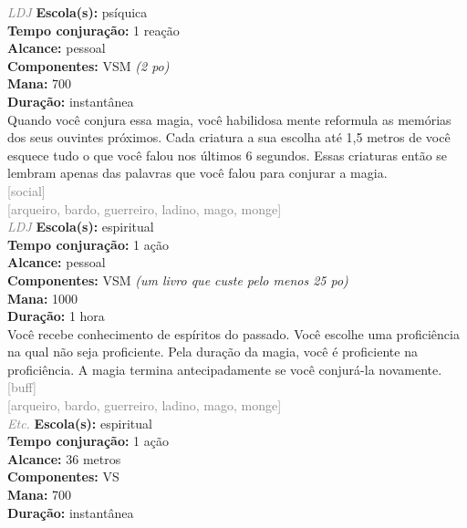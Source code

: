 \documentclass{RPG_Adventure}[2021/10/20]
\begin{document}
{\tiny \textcolor{gray}{\textit{LDJ}}}\jump{}
{\small \t \textbf{Escola(s):} psíquica\\\t \textbf{Tempo conjuração:} 1 reação\\\t \textbf{Alcance:} pessoal\\\t \textbf{Componentes:} VSM \textit{(2 po)}\\\t \textbf{Mana:} 700\\\t \textbf{Duração:} instantânea\\}
{\normalsize Quando você conjura essa magia, você habilidosa mente reformula as memórias dos seus ouvintes próximos. Cada criatura a sua escolha até 1,5 metros de você esquece tudo o que você falou nos últimos 6 segundos. Essas criaturas então se lembram apenas das palavras que você falou para conjurar a magia.\\}
{\scriptsize \textcolor{gray}{[social]\\}}
{\scriptsize \textcolor{gray}{[arqueiro, bardo, guerreiro, ladino, mago, monge]\\}}
{\tiny \textcolor{gray}{\textit{LDJ}}}\jump{}
{\small \t \textbf{Escola(s):} espiritual\\\t \textbf{Tempo conjuração:} 1 ação\\\t \textbf{Alcance:} pessoal\\\t \textbf{Componentes:} VSM \textit{(um livro que custe pelo menos 25 po)}\\\t \textbf{Mana:} 1000\\\t \textbf{Duração:} 1 hora\\}
{\normalsize Você recebe conhecimento de espíritos do passado. Você escolhe uma proficiência na qual não seja proficiente. Pela duração da magia, você é proficiente na proficiência. A magia termina antecipadamente se você conjurá-la novamente.\\}
{\scriptsize \textcolor{gray}{[buff]\\}}
{\scriptsize \textcolor{gray}{[arqueiro, bardo, guerreiro, ladino, mago, monge]\\}}
{\tiny \textcolor{gray}{\textit{Etc.}}}\jump{}
{\small \t \textbf{Escola(s):} espiritual\\\t \textbf{Tempo conjuração:} 1 ação\\\t \textbf{Alcance:} 36 metros\\\t \textbf{Componentes:} VS\\\t \textbf{Mana:} 700\\\t \textbf{Duração:} instantânea\\}
\end{document}
